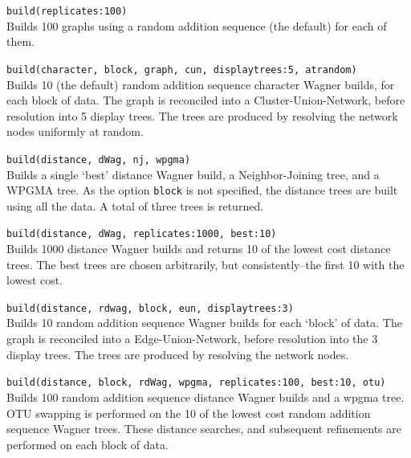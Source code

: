 	\begin{example}
	
		\item{\texttt{build(replicates:100)} \\
		Builds 100 graphs using a random addition sequence (the default) for each of them.}
		
		\item{\texttt{build(character, block, graph, cun, displaytrees:5, atrandom)}\\
		Builds 10 (the default) random addition sequence character Wagner builds, for each 
		block of data. The graph is reconciled into a Cluster-Union-Network, before resolution 
		into 5 display trees. The trees are produced by resolving the network nodes 
		uniformly at random.}
		
		\item{\texttt{build(distance, dWag, nj, wpgma)} \\ 
		Builds a single `best' distance Wagner build, a Neighbor-Joining tree, and a 
		WPGMA tree. As the option \texttt{block} is not specified, the distance trees 
		are built using all the data. A total of three trees is returned.}
		
		\item{\texttt{build(distance, dWag, replicates:1000, best:10)}\\
		Builds 1000 distance Wagner builds and returns 10 of the lowest cost distance trees.
		The best trees are chosen arbitrarily, but consistently--the first 10 with the lowest cost.}
	
		\item{\texttt{build(distance, rdwag, block, eun, displaytrees:3)}\\
		Builds 10 random addition sequence Wagner builds for each `block' of data. The graph 
		is reconciled into a Edge-Union-Network, before resolution into the 3 display trees. 
		The trees are produced by resolving the network nodes.}
		
		\item{\texttt{build(distance, block, rdWag, wpgma, replicates:100, best:10, otu)}\\
		Builds 100 random addition sequence distance Wagner builds and a wpgma tree. 
		OTU swapping is performed on the 10 of the lowest cost random addition 
		sequence Wagner trees. These distance searches, and subsequent refinements are 
		performed on each block of data.}
		
	\end{example}

